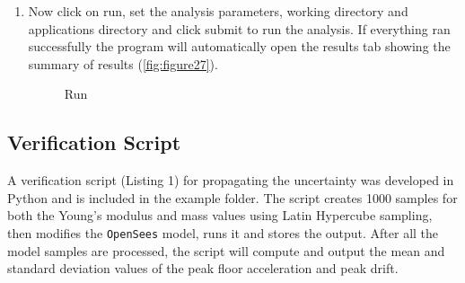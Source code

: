\begin{enumerate}
\item Now click on run, set the analysis parameters, working directory and applications directory and click submit to run the analysis. 
If everything ran successfully the program will automatically open the results tab showing the summary of results (\autoref{fig:figure27}).
\begin{figure}[!htbp]
  \caption{Run}
  \label{fig:figure27}
\end{figure}

\end{enumerate}


\subsection{Verification Script}
A verification script (Listing 1) for propagating the uncertainty was
developed in Python and is included in the example folder.  The script
creates 1000 samples for both the Young’s modulus and mass values
using Latin Hypercube sampling, then modifies the \texttt{OpenSees} model, runs
it and stores the output.  After all the model samples are processed,
the script will compute and output the mean and standard deviation
values of the peak floor acceleration and peak drift.


